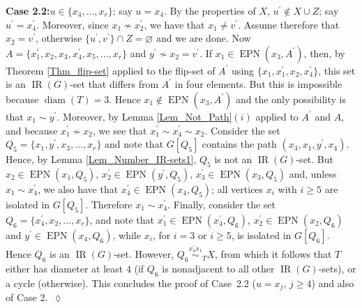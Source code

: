 \documentclass[12pt]{article}%
\begin{document}
\noindent\textbf{Case 2.2:\hspace{0.1in}}$u\in\{x_{4},...,x_{r}\}$; say
$u=x_{4}$. By the properties of $X$, $u^{\prime}\notin X\cup Z$; say
$u^{\prime}=x_{4}^{\prime}$. Moreover, since $x_{1}\nsim x_{2}^{\prime}$, we
have that $x_{1}\neq v^{\prime}$. Assume therefore that $x_{2}=v^{\prime}$,
otherwise $\{u^{\prime},v^{\prime}\}\cap Z=\varnothing$ and we are done. Now
$A=\{x_{1}^{\prime},x_{2},x_{3},x_{4}^{\prime},x_{5},...,x_{r}\}$ and
$y^{\prime}\nsim x_{2}=v^{\prime}$. If $x_{1}\in\operatorname{EPN}%
(x_{3},A^{\prime})$, then, by Theorem \ref{Thm_flip-set} applied to the
flip-set of $A^{\prime}$ using $\{x_{1},x_{1}^{\prime},x_{2},x_{4}^{\prime}%
\}$, this set is an $\operatorname{IR}(G)$-set that differs from $A^{\prime}$
in four elements. But this is impossible because $\operatorname{diam}(T)=3$.
Hence $x_{1}\notin\operatorname{EPN}(x_{3},A^{\prime})$ and the only
possibility is that $x_{1}\sim y^{\prime}$. Moreover, by Lemma
\ref{Lem_Not_Path}$(i)$ applied to $A^{\prime}$ and $A$, and because
$x_{1}^{\prime}\nsim x_{2}$, we see that $x_{1}^{\prime}\sim x_{4}^{\prime
}\sim x_{2}$. Consider the set $Q_{5}=\{x_{1},y^{\prime},x_{3},...,x_{r}\}$
and note that $G[Q_{5}]$ contains the path $(x_{3},x_{1},y^{\prime},x_{4})$.
Hence, by Lemma \ref{Lem_Number_IR-sets1}, $Q_{5}$ is not an
$\operatorname{IR}(G)$-set. But $x_{2}\in\operatorname{EPN}(x_{1},Q_{5})$,
$x_{2}^{\prime}\in\operatorname{EPN}(y^{\prime},Q_{5})$, $x_{3}^{\prime}%
\in\operatorname{EPN}(x_{3},Q_{5})$ and, unless $x_{1}\sim x_{4}^{\prime}$, we
also have that $x_{4}^{\prime}\in\operatorname{EPN}(x_{4},Q_{5})$; all
vertices $x_{i}$ with $i\geq5$ are isolated in $G[Q_{5}]$. Therefore
$x_{1}\sim x_{4}^{\prime}$. Finally, consider the set $Q_{6}=\{x_{4}^{\prime
},x_{2},...,x_{r}\}$, and note that $x_{1}^{\prime}\in\operatorname{EPN}%
(x_{4}^{\prime},Q_{6})$, $x_{2}^{\prime}\in\operatorname{EPN}(x_{2},Q_{6})$
and $y^{\prime}\in\operatorname{EPN}(x_{4},Q_{6})$, while $x_{i}$, for $i=3$
or $i\geq5$, is isolated in $G[Q_{6}]$. Hence $Q_{6}$ is an $\operatorname{IR}%
(G)$-set. However, $Q_{6}\overset{x_{4}^{\prime}x_{1}}{\sim}_{T}X$, from which
it follows that $T$ either has diameter at least $4$ (if $Q_{6}$ is
nonadjacent to all other $\operatorname{IR}(G)$-sets), or a cycle (otherwise).
This concludes the proof of Case~2.2 ($u=x_{j}$, $j\geq4$) and also of Case
2.~$\lozenge$\smallskip
\end{document}
